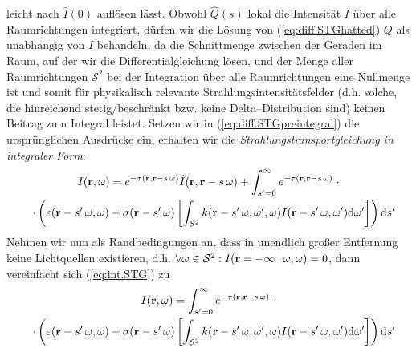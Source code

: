 	leicht nach ${\hat I}(0)$ auflösen lässt. Obwohl ${\hat Q}(s)$ lokal die Intensität $I$ über alle Raumrichtungen integriert, dürfen wir die Lösung von (\ref{eq:diff.STGhatted}) $Q$ als unabhängig von $I$ behandeln, da die Schnittmenge zwischen der Geraden im Raum, auf der wir die Differentialgleichung lösen, und der Menge aller Raumrichtungen $\mathcal{S}^2$ bei der Integration über alle Raumrichtungen eine Nullmenge ist und somit für physikalisch relevante Strahlungsintensitätsfelder (d.h. solche, die hinreichend stetig/beschränkt bzw. keine Delta--Distribution sind) keinen Beitrag zum Integral leistet.
	Setzen wir in (\ref{eq:diff.STGpreintegral}) die ursprünglichen Ausdrücke ein, erhalten wir die {\em Strahlungstransportgleichung in integraler Form}:
	\begin{multline}
		I(\mathbf{r},\omega) = e^{-\tau(\mathbf{r},\mathbf{r}-s\,\omega)} {\hat I}(\mathbf{r},\mathbf{r}-s\,\omega) + \int_{s'=0}^\infty e^{-\tau(\mathbf{r},\mathbf{r}-s\,\omega)} \;\cdot \\
		\quad\cdot\left( \varepsilon(\mathbf{r}-s'\,\omega,\omega) + \sigma(\mathbf{r}-s'\,\omega)
		\left[ \int_{\mathcal{S}^2} k(\mathbf{r}-s'\,\omega,\omega',\omega)I(\mathbf{r}-s'\,\omega,\omega') \text{d}\omega'\right] \right) \text{d}s'
		\label{eq:int.STG}
	\end{multline}
	Nehmen wir nun als Randbedingungen an, dass in unendlich großer Entfernung keine Lichtquellen existieren, d.h. $\forall \omega \in \mathcal{S}^2 : I(\mathbf{r}=-\infty\cdot\omega,\omega)=0$, dann vereinfacht sich (\ref{eq:int.STG}) zu
	\begin{multline}
		I(\mathbf{r},\omega) = \int_{s'=0}^\infty e^{-\tau(\mathbf{r},\mathbf{r}-s\,\omega)} \;\cdot \\
		\quad\cdot\left( \varepsilon(\mathbf{r}-s'\,\omega,\omega) + \sigma(\mathbf{r}-s'\,\omega)
		\left[ \int_{\mathcal{S}^2} k(\mathbf{r}-s'\,\omega,\omega',\omega)I(\mathbf{r}-s'\,\omega,\omega') \text{d}\omega'\right] \right) \text{d}s'
		\label{eq:int.STGdarkbg}
	\end{multline}


